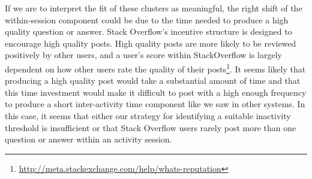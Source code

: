 If we are to interpret the fit of these clusters as meaningful, the right shift of the within-session component could be due to the time needed to produce a high quality question or answer.  Stack Overflow's incentive structure is designed to encourage high quality posts.  High quality posts are more likely to be reviewed positively by other users, and a user's score within StackOverflow is largely dependent on how other users rate the quality of their posts\footnote{\url{http://meta.stackexchange.com/help/whats-reputation}}.  It seems likely that producing a high quality post would take a substantial amount of time and that this time investment would make it difficult to post with a high enough frequency to produce a short inter-activity time component like we saw in other systems.  In this case, it seems that either our strategy for identifying a suitable inactivity threshold is insufficient or that Stack Overflow users rarely post more than one question or answer within an activity session.
